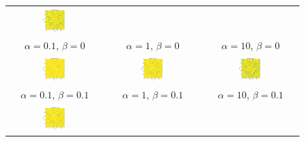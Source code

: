 \documentclass{article}
\begin{document}
\begin{figure}[htb]
\begin{minipage}[t]{0.72\textwidth}
\begin{tabular}{ccc}
            \includegraphics[width=0.28\textwidth]{imagenes/kalofolias/kalofolias_alpha10_beta0.pdf} \\
            $\alpha=0.1$, $\beta=0$ & $\alpha=1$, $\beta=0$ & $\alpha=10$, $\beta=0$ \\[1em]
            \includegraphics[width=0.28\textwidth]{imagenes/kalofolias/kalofolias_alpha0.1_beta0.1.pdf} &
            \includegraphics[width=0.28\textwidth]{imagenes/kalofolias/kalofolias_alpha1_beta0.1.pdf} &
            \includegraphics[width=0.28\textwidth]{imagenes/kalofolias/kalofolias_alpha10_beta0.1.pdf} \\
            $\alpha=0.1$, $\beta=0.1$ & $\alpha=1$, $\beta=0.1$ & $\alpha=10$, $\beta=0.1$ \\[1em]
            \includegraphics[width=0.28\textwidth]{imagenes/kalofolias/kalofolias_alpha0.1_beta1.pdf} &

\end{tabular}
\end{minipage}
\end{figure}
\end{document}
